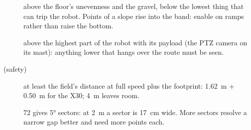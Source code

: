 \begin{description}
  \item[] above the floor's unevenness and the gravel, below the lowest thing that
    can trip the robot. Points of a slope rise into the band: enable
     on ramps rather than raise the bottom.
  \item[] above the highest part of the robot with its payload (the PTZ camera on
    its mast): anything lower that hangs over the route must be seen.
  \item[ (safety)] at least the field's distance at full speed plus the footprint:
    \SI{1.62}{m} + \SI{0.50}{m} for the X30; \SI{4}{m} leaves room.
  \item[] 72 gives \ang{5} sectors: at \SI{2}{m} a sector is \SI{17}{cm} wide.
    More sectors resolve a narrow gap better and need more points each.
\end{description}
